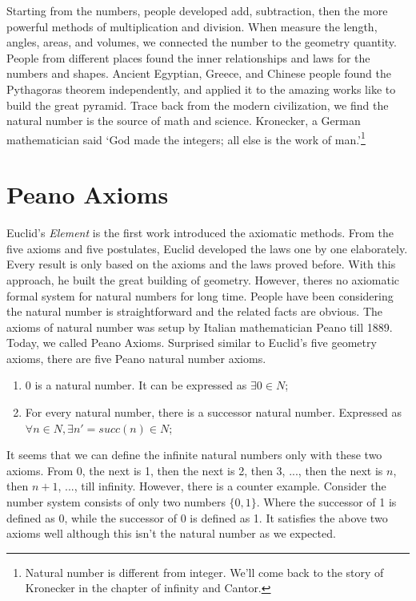 \documentclass[UTF8]{article}
\begin{document}
Starting from the numbers, people developed add, subtraction, then the more powerful methods of multiplication and division. When measure the length, angles, areas, and volumes, we connected the number to the geometry quantity. People from different places found the inner relationships and laws for the numbers and shapes. Ancient Egyptian, Greece, and Chinese people found the Pythagoras theorem independently, and applied it to the amazing works like to build the great pyramid. Trace back from the modern civilization, we find the natural number is the source of math and science. Kronecker, a German mathematician said `God made the integers; all else is the work of man.'\footnote{Natural number is different from integer. We'll come back to the story of Kronecker in the chapter of infinity and Cantor.}


\section{Peano Axioms}

Euclid's {\em Element} is the first work introduced the axiomatic methods. From the five axioms and five postulates, Euclid developed the laws one by one elaborately. Every result is only based on the axioms and the laws proved before. With this approach, he built the great building of geometry. However, theres no axiomatic formal system for natural numbers for long time. People have been considering the natural number is straightforward and the related facts are obvious. The axioms of natural number was setup by Italian mathematician Peano till 1889. Today, we called Peano Axioms. Surprised similar to Euclid's five geometry axioms, there are five Peano natural number axioms.

\begin{enumerate}
\item 0 is a natural number. It can be expressed as $\exists 0 \in N$;
\item For every natural number, there is a successor natural number. Expressed as $\forall n \in N, \exists n' = succ(n) \in N$;
\end{enumerate}

It seems that we can define the infinite natural numbers only with these two axioms. From 0, the next is 1, then the next is 2, then 3, ..., then the next is $n$, then $n+1$, ..., till infinity. However, there is a counter example. Consider the number system consists of only two numbers $\{0, 1\}$. Where the successor of 1 is defined as 0, while the successor of 0 is defined as 1. It satisfies the above two axioms well although this isn't the natural number as we expected.
\end{document}
